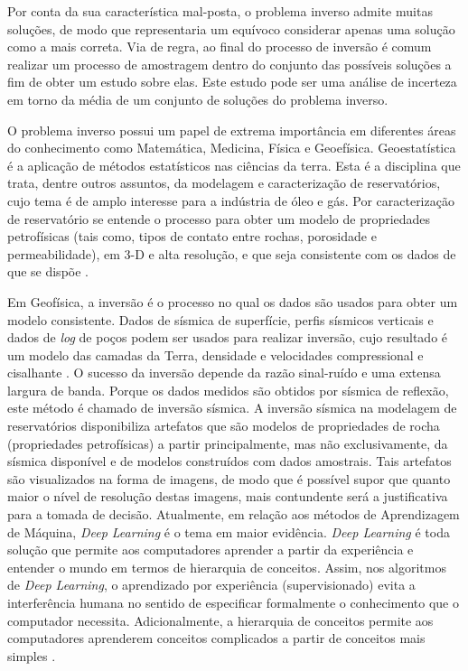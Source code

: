 Por conta da sua característica mal-posta, o problema inverso
admite muitas soluções, de modo que representaria um equívoco considerar apenas
uma solução como a mais correta. Via de regra, ao final do processo de inversão é comum
realizar um processo de amostragem dentro do conjunto das possíveis soluções a fim
de obter um estudo sobre elas. Este estudo pode ser uma análise de 
incerteza em torno da média de um conjunto de soluções do problema inverso.

O problema inverso possui um papel de extrema importância em diferentes áreas do conhecimento
como Matemática, Medicina, Física e Geoefísica. Geoestatística é a aplicação de métodos
estatísticos nas ciências da terra. Esta é a disciplina que trata, dentre outros assuntos, da modelagem
e caracterização de reservatórios, cujo tema é de amplo interesse para a indústria de óleo
e gás. Por caracterização de reservatório se entende o processo para obter um modelo de propriedades
petrofísicas (tais como, tipos de contato entre rochas, porosidade e permeabilidade),
em 3-D e alta resolução, e que seja consistente com os dados de que se dispõe \citep{deutsch2002}.

Em Geofísica, a inversão é o processo no qual os dados são usados para obter um modelo
consistente. Dados de sísmica de superfície, perfis sísmicos verticais e
dados de \textit{log} de poços podem ser usados para realizar inversão, cujo
resultado é um modelo das camadas da Terra, densidade e velocidades compressional
e cisalhante \citep{WinNT}. O sucesso da inversão depende da razão sinal-ruído e uma extensa
largura de banda. Porque os dados medidos são obtidos por sísmica de reflexão,
este método é chamado de inversão sísmica. A inversão sísmica na
modelagem de reservatórios disponibiliza artefatos que são modelos de propriedades de rocha
(propriedades petrofísicas) a partir principalmente, mas não exclusivamente,
da sísmica disponível e de modelos construídos com dados amostrais. Tais artefatos
são visualizados na forma de imagens, de modo que é possível supor que quanto maior
o nível de resolução destas imagens, mais contundente será a justificativa para a tomada de decisão.
%
Atualmente, em relação aos métodos de Aprendizagem de Máquina, \textit{Deep Learning} é o tema em
maior evidência. \textit{Deep Learning} é toda solução que permite aos
computadores aprender a partir da experiência e entender o mundo em
termos de hierarquia de conceitos.
Assim, nos algoritmos de \textit{Deep Learning}, o aprendizado
por experiência (supervisionado) evita a interferência
humana no sentido de especificar formalmente o conhecimento que o computador necessita.
Adicionalmente, a hierarquia de conceitos permite aos computadores aprenderem
conceitos complicados a partir de conceitos mais simples \citep{Gdfl16}.

